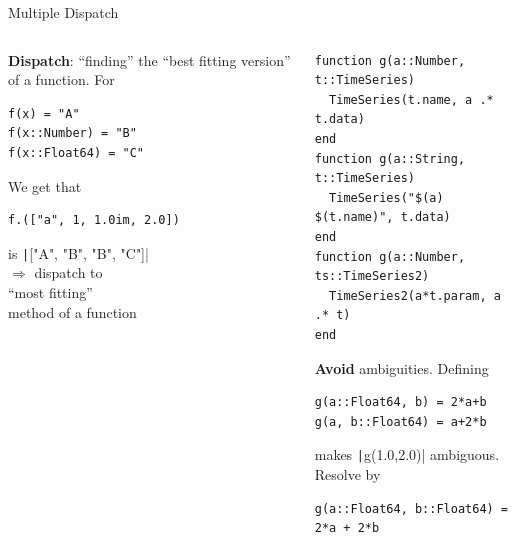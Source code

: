 \documentclass[aspectratio=169, 12pt]{beamer}
\begin{document}
    \begin{frame}[fragile]{Multiple Dispatch}
        \begin{columns}[T]
            \begin{column}{.37\textwidth}
                \textbf{Dispatch}: “finding” the “best fitting version”
                of a function.
                \pause For
                \\
                \begin{verbatim}
f(x) = "A"
f(x::Number) = "B"
f(x::Float64) = "C"
                \end{verbatim}
                \pause
                \vspace{\baselineskip}
                We get that
                \begin{verbatim}
f.(["a", 1, 1.0im, 2.0])
                \end{verbatim}
                is \texttt|["A", "B", "B", "C"]|
                \pause
                \\[\baselineskip]
                $\Rightarrow$ dispatch to\\
                “most fitting”\\
                \alert{method} of a \alert{function}
            \end{column}
            \begin{column}{.62\textwidth}
                \vspace{-.25\baselineskip}
                \begin{verbatim}
function g(a::Number, t::TimeSeries)
  TimeSeries(t.name, a .* t.data)
end
function g(a::String, t::TimeSeries)
  TimeSeries("$(a) $(t.name)", t.data)
end
function g(a::Number, ts::TimeSeries2)
  TimeSeries2(a*t.param, a .* t)
end
                \end{verbatim}
                \pause
                \alert{\textbf{Avoid}} ambiguities. Defining
                \begin{verbatim}
g(a::Float64, b) = 2*a+b
g(a, b::Float64) = a+2*b
                \end{verbatim}
                makes \texttt|g(1.0,2.0)|
                \alert{ambiguous}.
                \pause Resolve by
                \begin{verbatim}
g(a::Float64, b::Float64) = 2*a + 2*b
                \end{verbatim}
            \end{column}
        \end{columns}
    \end{frame}
\end{document}

